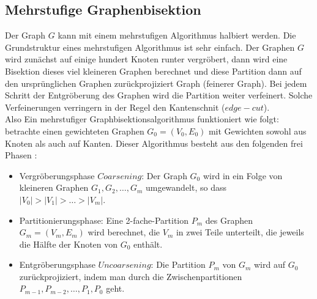 \documentclass[runningheads]{llncs}
\begin{document}

\subsection{Mehrstufige Graphenbisektion}
Der Graph $G$ kann mit einem mehrstufigen Algorithmus halbiert werden. Die Grundstruktur eines mehrstufigen Algorithmus ist sehr einfach. Der
Graphen $G$ wird zunächst auf einige hundert Knoten runter vergröbert, dann wird eine Bisektion dieses viel kleineren Graphen berechnet und diese Partition dann auf den ursprünglichen Graphen zurückprojiziert Graph (feinerer Graph). Bei jedem Schritt der Entgröberung des Graphen wird die Partition weiter verfeinert. Solche Verfeinerungen verringern in der Regel den Kantenschnit ($edge-cut$).\\
Also Ein mehrstufiger Graphbisektionsalgorithmus funktioniert wie folgt: betrachte einen gewichteten Graphen $G_0 = (V_0, E_0)$ mit Gewichten sowohl aus Knoten als auch auf Kanten. Dieser Algorithmus besteht aus den folgenden frei Phasen \cite{karypis1998fast}:
\begin{itemize}
	\item Vergröberungsphase $Coarsening$: Der Graph $G_0$ wird in ein Folge von kleineren Graphen $G_1, G_2, \ldots, G_m$ umgewandelt, so dass $\lvert V_0 \lvert > \lvert V_1 \lvert > \ldots > \lvert V_m \lvert.$
	\item Partitionierungsphase: Eine 2-fache-Partition $P_m$ des Graphen $G_m = (V_m, E_m)$ wird berechnet, die $V_m$ in zwei Teile unterteilt, die jeweils die Hälfte der Knoten von $G_0$ enthält. 
	\item Entgröberungsphase $Uncoarsening$: Die Partition $P_m$ von $G_m$ wird auf $G_0$ zurückprojiziert, indem man durch die Zwischenpartitionen $P_{m-1}, P_{m-2}, \ldots, P_1, P_0$ geht.  
\end{itemize} 
\setcounter{secnumdepth}{3}
\end{document}
